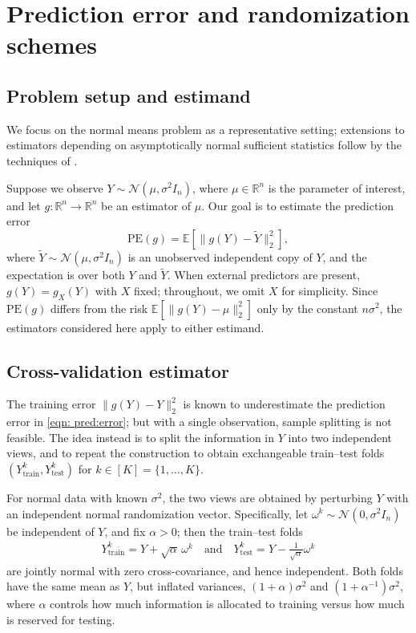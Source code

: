 \documentclass[12pt]{article}
\def\R{\mathbb{R}}
\def\calN{\mathcal{N}}
\theoremstyle{general}
\begin{document}
\section{Prediction error and randomization schemes}

\subsection{Problem setup and estimand}

We focus on the normal means problem as a representative setting; extensions to estimators depending on asymptotically normal sufficient statistics follow by the techniques of \citet{liu2024cross}.

Suppose we observe $Y\sim\calN(\mu,\sigma^2 I_n)$, where $\mu\in\R^n$ is the parameter of interest, and let $g:\R^n\to\R^n$ be an estimator of $\mu$.
Our goal is to estimate the prediction error
\begin{equation}
\label{eqn: pred:error}
\text{PE}(g)= \mathbb{E}\left[ \|g(Y) - \widetilde{Y}\|_2^2\right],
\end{equation}
where $\widetilde{Y}\sim \calN(\mu, \sigma^2 I_n)$ is an unobserved independent copy of $Y$, and the expectation is over both $Y$ and $\widetilde{Y}$.
When external predictors are present, $g(Y)=g_X(Y)$ with $X$ fixed; throughout, we omit $X$ for simplicity.
Since $\text{PE}(g)$ differs from the risk $\mathbb{E}[\|g(Y)-\mu\|_2^2]$ only by the constant $n\sigma^2$, the estimators considered here apply to either estimand.


\subsection{Cross-validation estimator}

The training error $\|g(Y)-Y\|_2^2$ is known to underestimate the prediction error in \eqref{eqn: pred:error}; but with a single observation, sample splitting is not feasible.
The idea instead is to split the information in $Y$ into two independent views, and to repeat the construction to obtain exchangeable train--test folds $(Y^k_{\text{train}}, Y^k_{\text{test}})$ for $k\in[K]=\{1,\ldots,K\}$.

For normal data with known $\sigma^2$, the two views are obtained by perturbing $Y$ with an independent normal randomization vector.
Specifically, let $\omega^k\sim\calN(0,\sigma^2I_n)$ be independent of $Y$, and fix $\alpha>0$; then the train--test folds
\begin{align}
\label{eqn: train-test}
    Y^k_{\text{train}} = Y + \sqrt\alpha\, \omega^k \quad \text{and}\quad  Y^k_{\text{test}} = Y - \frac{1}{\sqrt\alpha}\omega^k
\end{align}
are jointly normal with zero cross-covariance, and hence independent.
Both folds have the same mean as $Y$, but inflated variances, $(1+\alpha)\sigma^2$ and $(1+\alpha^{-1})\sigma^2$, where $\alpha$ controls how much information is allocated to training versus how much is reserved for testing.
\end{document}
